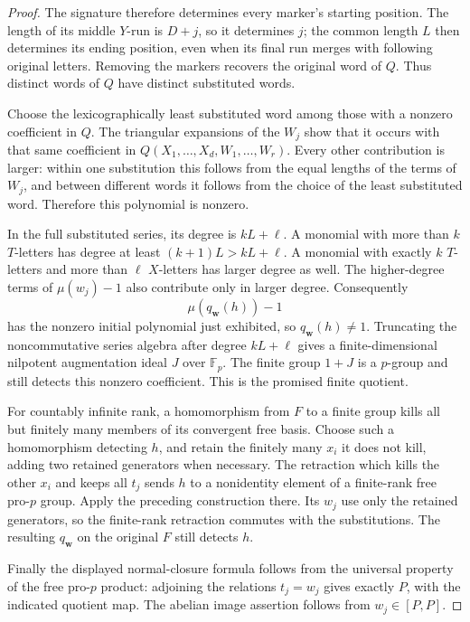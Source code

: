 \begin{proof}
The signature therefore determines every marker's starting
position.  The length of its middle $Y$-run is $D+j$, so it
determines $j$; the common length $L$ then determines its
ending position, even when its final run merges with
following original letters.  Removing the markers recovers
the original word of $Q$.  Thus distinct words of $Q$ have
distinct substituted words.

Choose the lexicographically least substituted word among
those with a nonzero coefficient in $Q$.
The triangular expansions of the $W_j$ show that it occurs
with that same coefficient in $Q(X_1,\ldots,X_d,W_1,\ldots,W_r)$.
Every other contribution is larger: within one substitution
this follows from the equal lengths of the terms of $W_j$,
and between different words it follows from the choice of
the least substituted word.  Therefore this polynomial is
nonzero.

In the full substituted series, its degree is $kL+\ell$.
A monomial with more than $k$ $T$-letters has degree at least
$(k+1)L>kL+\ell$.  A monomial with exactly $k$ $T$-letters
and more than $\ell$ $X$-letters has larger degree as well.
The higher-degree terms of $\mu(w_j)-1$ also contribute
only in larger degree.  Consequently
\[
 \mu(q_{\boldsymbol w}(h))-1
\]
has the nonzero initial polynomial just exhibited, so
$q_{\boldsymbol w}(h)\ne1$.
Truncating the noncommutative series algebra after degree
$kL+\ell$ gives a finite-dimensional nilpotent augmentation
ideal $J$ over $\mathbb F_p$.
The finite group $1+J$ is a $p$-group and still detects this
nonzero coefficient.  This is the promised finite quotient.

For countably infinite rank, a homomorphism from $F$ to a
finite group kills all but finitely many members of its
convergent free basis.  Choose such a homomorphism detecting
$h$, and retain the finitely many $x_i$ it does not kill,
adding two retained generators when necessary.  The
retraction which kills the other $x_i$ and keeps all $t_j$
sends $h$ to a nonidentity element of a finite-rank free
pro-$p$ group.  Apply the preceding construction there.
Its $w_j$ use only the retained generators, so the finite-rank
retraction commutes with the substitutions.  The resulting
$q_{\boldsymbol w}$ on the original $F$ still detects $h$.

Finally the displayed normal-closure formula follows from
the universal property of the free pro-$p$ product: adjoining
the relations $t_j=w_j$ gives exactly $P$, with the indicated
quotient map.  The abelian image assertion follows from
$w_j\in[P,P]$.
\end{proof}

